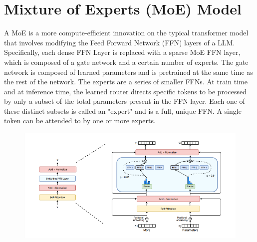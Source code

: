 \documentclass[12pt]{article}
\begin{document}
\section{Mixture of Experts (MoE) Model}
A MoE is a more compute-efficient innovation on the typical transformer model that involves modifying the Feed Forward Network (FFN) layers of a LLM. Specifically, each dense FFN Layer is replaced with a sparse MoE FFN layer, which is composed of a gate network and a certain number of experts. The gate network is composed of learned parameters and is pretrained at  the same time as the rest of the network. The experts are a series of smaller FFNs. At train time and at inference time, the learned router directs specific tokens to be processed by only a subset of the total parameters present in the FFN layer. Each one of these distinct subsets is called an "expert" and is a full, unique FFN. A single token can be attended to by one or more experts. 

\begin{figure}[H]
    \centering
    \includegraphics[width=1.0\textwidth]{./moecircuit.png}
\end{figure}
\end{document}
